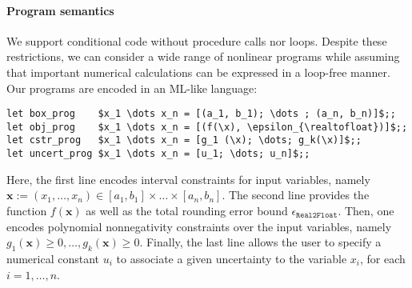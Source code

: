 \documentclass[preprint,fleqn,nocopyrightspace]{sigplanconf}
\newcommand{\x}{\mathbf{x}}
\newcommand{\realtofloat}{\mathtt{Real2Float}}
\theoremstyle{plain}
\begin{document}
\paragraph{Program semantics}
%
We support conditional code without procedure calls nor loops. Despite these restrictions, we can consider a wide range of nonlinear programs while assuming that  important numerical calculations can be expressed in a loop-free manner. 
Our programs are encoded in an ML-like language:
\begin{lstlisting}
let box_prog    $x_1 \dots x_n = [(a_1, b_1); \dots ; (a_n, b_n)]$;;
let obj_prog    $x_1 \dots x_n = [(f(\x), \epsilon_{\realtofloat})]$;;
let cstr_prog   $x_1 \dots x_n = [g_1 (\x); \dots; g_k(\x)]$;;
let uncert_prog $x_1 \dots x_n = [u_1; \dots; u_n]$;;
\end{lstlisting}
Here, the first line encodes interval constraints for input variables, namely $\x := (x_1, \dots, x_n) \in [a_1, b_1]\times \dots \times [a_n, b_n]$.
The second line provides the function $f(\x)$ as well as the total rounding error bound $\epsilon_{\realtofloat}$.
Then, one encodes polynomial nonnegativity constraints over the input variables, namely $g_1(\x) \geq 0, \dots, g_k(\x) \geq 0$. Finally, the last line allows the user to specify a numerical constant $u_i$ to associate a given uncertainty to the variable $x_i$, for each $i= 1, \dots, n$.
\end{document}
